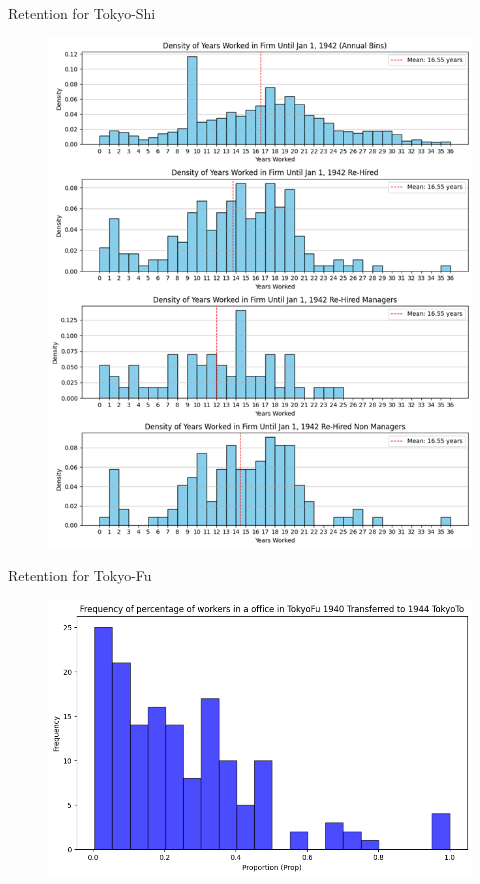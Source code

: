 \begin{frame}{Retention for Tokyo-Shi}
    \begin{figure}
        \centering
        \includegraphics[height = 0.9\textheight]{Background/RehiringTokyoShi.png}
        \label{fig:enter-label}
    \end{figure}
\end{frame}


\begin{frame}{Retention for Tokyo-Fu}
    \begin{figure}
        \centering
        \includegraphics[width = \textwidth]{Background/TokyoFuTransfer.png}
        \label{fig:enter-label}
    \end{figure}
\end{frame}

